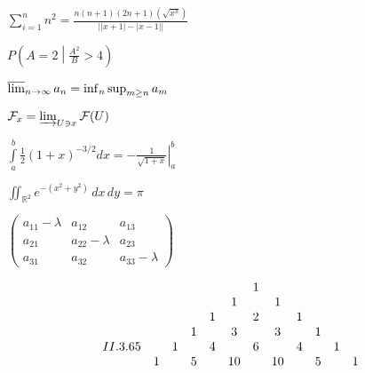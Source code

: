 \documentclass{article}
\begin{document}
	$\sum_{i=1}^n n^2=\frac{n(n+1)(2n+1)(\sqrt{x^3})}{\left| |x+1|-|x-1|\right|}$
	\vspace{\baselineskip}
	
	
	$P\left(A=2\middle|\frac{A^2}{B}>4\right)$
	
	\vspace{\baselineskip}
	
	$\varlimsup_{n\to\infty}
	a_n=\inf_n\sup_{m\ge n}a_m$
	\vspace{\baselineskip}
	
	$\mathcal F_x=
	\varinjlim_{U\ni x}\mathcal F(U)$
	\vspace{\baselineskip}
	
	$\boxed{\int\limits_a^b\frac12
		(1+x)^{-3/2}dx=
		\left.-\frac{1}{\sqrt{1+x}}
		\right|_a^b}$
	\vspace{\baselineskip}
	
	$\boxed{
		\iint_{\mathbb R^2}
		e^{-(x^2+y^2)}\,dx\,dy=\pi
	}$
	\vspace{\baselineskip}
	
	$\begin{pmatrix}
		a_{11}-\lambda & a_{12}&a_{13}\\
		a_{21}& a_{22}-\lambda &a_{23}\\
		a_{31}& a_{32}&a_{33}-\lambda
	\end{pmatrix}$
	\vspace{\baselineskip}
	
	\[
	\setcounter{MaxMatrixCols}{20}
	\begin{matrix}
		&&&&&& 1\\
		&&&&& 1 && 1\\
		&&&& 1 && 2 && 1\\
		&&& 1 && 3 && 3 && 1\\
		II.3.65 && 1 && 4 && 6 && 4 && 1\\
		&1 && 5 && 10 && 10 && 5 && 1
	\end{matrix}
	\]
	\vspace{\baselineskip}
\end{document}
